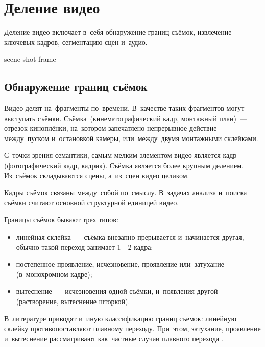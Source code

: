 
\section{Деление видео}

Деление видео включает в~себя обнаружение границ съёмок,
извлечение ключевых кадров, сегментацию сцен и~аудио.

\begin{figured}
    {scene-shot-frame}
\end{figured}

\subsection{Обнаружение границ съёмок}

Видео делят на~фрагменты по~времени.
В~качестве таких фрагментов могут выступать съёмки.
Съёмка\ (кинематографический кадр,
монтажный план)~— отрезок киноплёнки,
на~котором запечатлено непрерывное действие между~пуском
и~остановкой камеры, или~между~двумя монтажными склейками.

С~точки зрения семантики, самым мелким элементом видео является кадр
(фотографический кадр, кадрик).
Съёмка является более крупным делением.
Из~съёмок складываются сцены, а~из~сцен видео целиком.

Кадры съёмок связаны между~собой по~смыслу.
В~задачах анализа и~поиска съёмки считают
основной структурной единицей видео.

\noindent
Границы съёмок бывают трех типов:
\begin{itemize}
    \item линейная склейка~— съёмка внезапно
            прерывается и~начинается другая,
            обычно такой переход занимает 1—2 кадра;
    \item постепенное проявление, исчезновение, проявление или~затухание
            (в~монохромном кадре);
    \item вытеснение~— исчезновения одной съёмки,
            и~появления другой (растворение, вытеснение шторкой).
\end{itemize}

В~литературе приводят и~иную классификацию границ съемок:
линейную склейку противопоставляют плавному переходу.
При~этом, затухание, проявление и~вытеснение
рассматривают как~частные случаи плавного перехода \cite{Hattarge:2014}.

